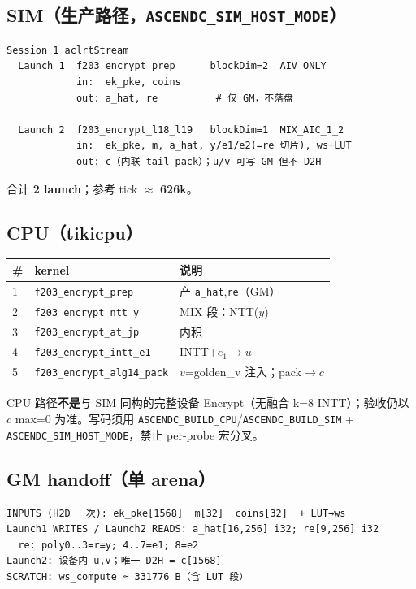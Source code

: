 \documentclass[UTF8,a4paper,11pt]{ctexart}
\begin{document}
\subsection{SIM（生产路径，\texttt{ASCENDC\_SIM\_HOST\_MODE}）}

\begin{verbatim}
Session 1 aclrtStream
  Launch 1  f203_encrypt_prep      blockDim=2  AIV_ONLY
            in:  ek_pke, coins
            out: a_hat, re          # 仅 GM，不落盘

  Launch 2  f203_encrypt_l18_l19   blockDim=1  MIX_AIC_1_2
            in:  ek_pke, m, a_hat, y/e1/e2(=re 切片), ws+LUT
            out: c（内联 tail pack）；u/v 可写 GM 但不 D2H
\end{verbatim}

合计 \textbf{2 launch}；参考 tick $\approx$ \textbf{626k}。

\subsection{CPU（tikicpu）}

\begin{longtable}{@{}L{0.8cm}L{4.5cm}L{7.5cm}@{}}
\toprule
\# & kernel & 说明 \\
 & \texttt{f203\_encrypt\_prep} & 产 \texttt{a\_hat},\texttt{re}（GM） \\
2 & \texttt{f203\_encrypt\_ntt\_y} & MIX 段：NTT($y$) \\
3 & \texttt{f203\_encrypt\_at\_jp} & 内积 \\
4 & \texttt{f203\_encrypt\_intt\_e1} & INTT+$e_1\to u$ \\
5 & \texttt{f203\_encrypt\_alg14\_pack} & $v$=golden\_v 注入；pack$\to c$ \\
\bottomrule
\end{longtable}

CPU 路径\textbf{不是}与 SIM 同构的完整设备 Encrypt（无融合 k=8 INTT）；验收仍以 $c$ max=0 为准。写码须用 \texttt{ASCENDC\_BUILD\_CPU}/\texttt{ASCENDC\_BUILD\_SIM} + \texttt{ASCENDC\_SIM\_HOST\_MODE}，禁止 per-probe 宏分叉。

\subsection{GM handoff（单 arena）}

\begin{verbatim}
INPUTS (H2D 一次): ek_pke[1568]  m[32]  coins[32]  + LUT→ws
Launch1 WRITES / Launch2 READS: a_hat[16,256] i32; re[9,256] i32
  re: poly0..3=r≡y; 4..7=e1; 8=e2
Launch2: 设备内 u,v；唯一 D2H = c[1568]
SCRATCH: ws_compute ≈ 331776 B（含 LUT 段）
\end{verbatim}
\end{document}

